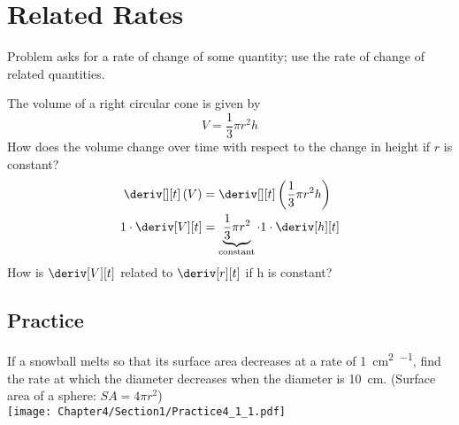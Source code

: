 
\section{Related Rates}
Problem asks for a rate of change of some quantity; use the rate of change of related quantities.
\begin{example}
    The volume of a right circular cone is given by
    \begin{equation*}
        V = \dfrac{1}{3}\pi r^2h
    \end{equation*}
    How does the volume change over time with respect to the change in height if $r$ is constant?
    \begin{align*}
        \deriv[][t]\left(V\right) &= \deriv[][t]\left(\dfrac{1}{3}\pi r^2 h\right) \\
        1 \cdot \deriv[V][t] &= \underbrace{\dfrac{1}{3}\pi r^2}_\text{constant} \cdot 1 \cdot \deriv[h][t]
    \end{align*}
    How is $\deriv[V][t]$ related to $\deriv[r][t]$ if h is constant?

\end{example}
\subsection{Practice}
If a snowball melts so that its surface area decreases at a rate of \SI{1}{\cm\squared\per\min}, find the rate at which the diameter decreases when the diameter is \SI{10}{\cm}. (Surface area of a sphere: $SA = 4\pi r^2$)\\
\texttt{[image: Chapter4/Section1/Practice4\_1\_1.pdf]}\\
